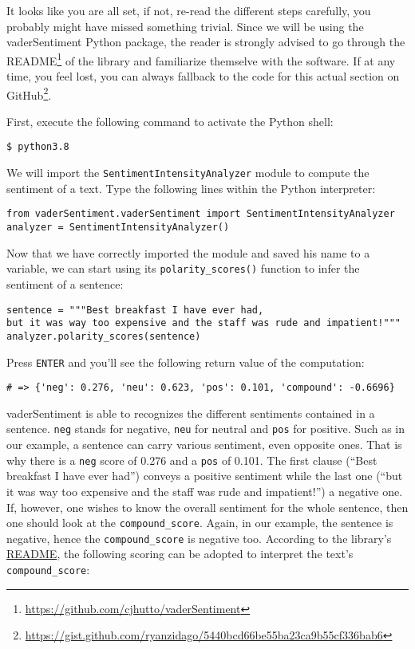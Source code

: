 	It looks like you are all set, if not, re-read the different steps carefully, you probably might have missed something trivial. Since we will be using the vaderSentiment Python package, the reader is strongly advised to go through the README\footnote{\href{https://github.com/cjhutto/vaderSentiment}{https://github.com/cjhutto/vaderSentiment}} of the library and familiarize themselve with the software. If at any time, you feel lost, you can always fallback to the code for this actual section on GitHub\footnote{\href{https://gist.github.com/ryanzidago/5440bcd66be55ba23ca9b55cf336bab6}{https://gist.github.com/ryanzidago/5440bcd66be55ba23ca9b55cf336bab6}}.
	
	First, execute the following command to activate the Python shell:
	\begin{Verbatim}
$ python3.8
	\end{Verbatim}
	We will import the \verb|SentimentIntensityAnalyzer| module to compute the sentiment of a text. Type the following lines within the Python interpreter:
	\begin{Verbatim}
from vaderSentiment.vaderSentiment import SentimentIntensityAnalyzer
analyzer = SentimentIntensityAnalyzer()
	\end{Verbatim}
Now that we have correctly imported the module and saved his name to a variable, we can start using its \verb|polarity_scores()| function to infer the sentiment of a sentence:
	\begin{Verbatim}
sentence = """Best breakfast I have ever had, 
but it was way too expensive and the staff was rude and impatient!"""
analyzer.polarity_scores(sentence)
	\end{Verbatim}
	Press \verb|ENTER| and you'll see the following return value of the computation:
\begin{Verbatim}
# => {'neg': 0.276, 'neu': 0.623, 'pos': 0.101, 'compound': -0.6696}
\end{Verbatim}
	vaderSentiment is able to recognizes the different sentiments contained in a sentence. \verb|neg| stands for negative, \verb|neu| for neutral and \verb|pos| for positive. Such as in our example, a sentence can carry various sentiment, even opposite ones. That is why there is a \verb|neg| score of 0.276 and a \verb|pos| of 0.101. The first clause (``Best breakfast I have ever had'') conveys a positive sentiment while the last one (``but it was way too expensive and the staff was rude and impatient!'') a negative one. If, however, one wishes to know the overall sentiment for the whole sentence, then one should look at the \verb|compound_score|. Again, in our example, the sentence is negative, hence the \verb|compound_score| is negative too. According to the library's \href{https://github.com/cjhutto/vaderSentiment#about-the-scoring}{README}, the following scoring can be adopted to interpret the text's \verb|compound_score|: 
	
